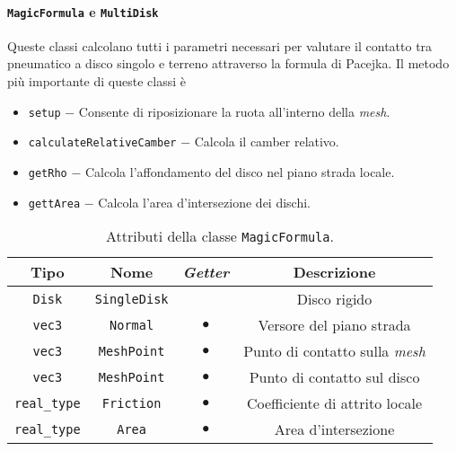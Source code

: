 \paragraph{\texttt{MagicFormula} e \texttt{MultiDisk}}
Queste classi calcolano tutti i parametri necessari per valutare il contatto tra pneumatico a disco singolo e terreno attraverso la formula di Pacejka. Il metodo più importante di queste classi è
\begin{itemize}
	\item \texttt{setup} $-$ Consente di riposizionare la ruota all'interno della \textit{mesh}.
	\item \texttt{calculateRelativeCamber} $-$ Calcola il camber relativo.
	\item \texttt{getRho} $-$ Calcola l'affondamento del disco nel piano strada locale.
	\item \texttt{gettArea} $-$ Calcola l'area d'intersezione dei dischi.
\end{itemize}
\begin{table}[h!]
	\centering
	\begin{tabular}{|c|c|c|c|}
		\hline 
		\textbf{Tipo} & \textbf{Nome} & \textit{\textbf{Getter}} & \textbf{Descrizione} \\ \hline 
		\texttt{Disk} & \texttt{SingleDisk} &  & Disco rigido \\ \hline 
		\texttt{vec3} & \texttt{Normal} & $\bullet$ & Versore del piano strada \\ \hline
		\texttt{vec3} & \texttt{MeshPoint} & $\bullet$ & Punto di contatto sulla \textit{mesh} \\ \hline
		\texttt{vec3} & \texttt{MeshPoint} & $\bullet$ & Punto di contatto sul disco \\ \hline
		\texttt{real\_type} & \texttt{Friction} & $\bullet$ & Coefficiente di attrito locale \\ \hline
		\texttt{real\_type} & \texttt{Area} & $\bullet$ & Area d'intersezione \\ \hline
	\end{tabular}
	\caption{Attributi della classe \texttt{MagicFormula}.}
	\label{}
\end{table}
%
